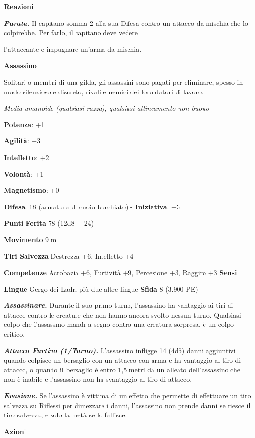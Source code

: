 \begin{multicols}{2}
\textbf{Reazioni}

\emph{\textbf{Parata.}} Il capitano somma 2 alla sua Difesa contro un
attacco da mischia che lo colpirebbe. Per farlo, il capitano deve vedere

l'attaccante e impugnare un'arma da mischia.

\textbf{Assassino}

Solitari o membri di una gilda, gli assassini sono pagati per eliminare,
spesso in modo silenzioso e discreto, rivali e nemici dei loro datori di
lavoro.

\emph{Media umanoide (qualsiasi razza), qualsiasi allineamento non
buono}

\textbf{Potenza}: +1

\textbf{Agilità}: +3

\textbf{Intelletto}: +2

\textbf{Volontà}: +1

\textbf{Magnetismo}: +0

\textbf{Difesa}: 18 (armatura di cuoio borchiato) - \textbf{Iniziativa}: +3

\textbf{Punti Ferita} 78 (12d8 + 24)

\textbf{Movimento} 9 m

\textbf{Tiri Salvezza} Destrezza +6, Intelletto +4

\textbf{Competenze} Acrobazia +6, Furtività +9, Percezione +3, Raggiro +3
\textbf{Sensi} 

\textbf{Lingue} Gergo dei Ladri più due altre lingue \textbf{Sfida} 8
(3.900 PE)

\emph{\textbf{Assassinare.}} Durante il suo primo turno, l'assassino ha
vantaggio ai tiri di attacco contro le creature che non hanno ancora
svolto nessun turno. Qualsiasi colpo che l'assassino mandi a segno
contro una creatura sorpresa, è un colpo critico.

\emph{\textbf{Attacco Furtivo (1/Turno).}} L'assassino infligge 14 (4d6)
danni aggiuntivi quando colpisce un bersaglio con un attacco con arma e
ha vantaggio al tiro di attacco, o quando il bersaglio è entro 1,5 metri
da un alleato dell'assassino che non è inabile e l'assassino non ha
svantaggio al tiro di attacco.

\emph{\textbf{Evasione.}} Se l'assassino è vittima di un effetto che
permette di effettuare un tiro salvezza su Riflessi per dimezzare i
danni, l'assassino non prende danni se riesce il tiro salvezza, e solo
la metà se lo fallisce.

\textbf{Azioni}


\end{multicols}
